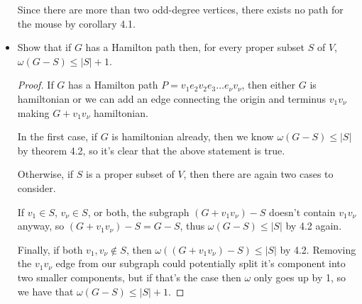 \documentclass[11pt]{article}
\newcommand\itm[1]{\item[\textbf{#1}]}
\newcommand{\n}{\vspace{0.5cm}}
\begin{document}
\begin{itemize}
  Since there are more than two odd-degree vertices, there exists no path for the mouse by corollary 4.1. \n


  \itm{4.2.3} Show that if \(G\) has a Hamilton path then, for every proper subset \(S\) of \(V\), \(\omega(G-S) \leq |S|+1\).
  \begin{proof}
    If \(G\) has a Hamilton path \(P = v_1e_2v_2e_3 \hdots e_{\nu}v_{\nu}\), then either \(G\) is hamiltonian or we can add an edge connecting the origin and terminus \(v_1v_{\nu}\) making \(G + v_1v_{\nu}\) hamiltonian.

    In the first case, if \(G\) is hamiltonian already, then we know \(\omega(G-S) \leq |S|\) by theorem 4.2, so it's clear that the above statement is true. \n

    Otherwise, if \(S\) is a proper subset of \(V\), then there are again two cases to consider.

    If \(v_1 \in S\), \(v_{\nu} \in S\), or both, the subgraph \((G + v_1v_{\nu}) - S\) doesn't contain \(v_1v_{\nu}\) anyway, so \((G + v_1v_{\nu}) - S = G - S\), thus \(\omega(G-S) \leq |S|\) by 4.2 again.

    Finally, if both \(v_1,v_{\nu} \not\in S\), then \(\omega((G+v_1v_{\nu})-S) \leq |S|\) by 4.2.  Removing the \(v_1v_{\nu}\) edge from our subgraph could potentially split it's component into two smaller components, but if that's the case then \(\omega\) only goes up by 1, so we have that \(\omega(G-S) \leq |S|+1\).
  \end{proof}
  

\end{itemize}
\end{document}

